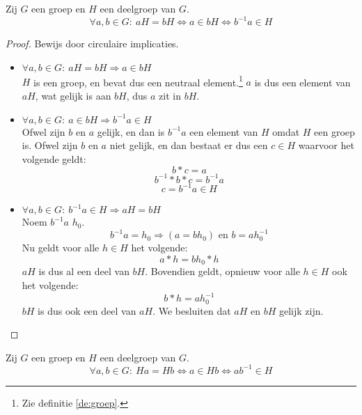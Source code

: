 \documentclass[main.tex]{subfiles}
\begin{document}
\begin{ei}
  \label{ei:linker-nevenklasse-eig}
  Zij $G$ een groep en $H$ een deelgroep van $G$.
  \[ \forall a,b \in G:\ aH = bH \Leftrightarrow a \in bH \Leftrightarrow b^{-1}a \in H \]

  \begin{proof}
    Bewijs door circulaire implicaties.
    \begin{itemize}
    \item $\forall a,b \in G:\ aH = bH \Rightarrow a \in bH$\\
      $H$ is een groep, en bevat dus een neutraal element.\footnote{Zie definitie \ref{de:groep}.}
      $a$ is dus een element van $aH$, wat gelijk is aan $bH$, dus $a$ zit in $bH$.
    \item $\forall a,b \in G:\ a \in bH \Rightarrow b^{-1}a \in H$\\
      Ofwel zijn $b$ en $a$ gelijk, en dan is $b^{-1}a$ een element van $H$ omdat $H$ een groep is.
      Ofwel zijn $b$ en $a$ niet gelijk, en dan bestaat er dus een $c \in H$ waarvoor het volgende geldt:
      \[ b*c = a\]
      \[ b^{-1}*b*c = b^{-1}a\]
      \[ c = b^{-1}a \in H \]
    \item $\forall a,b \in G:\ b^{-1}a \in H\Rightarrow aH = bH$\\
      Noem $b^{-1}a$ $h_{0}$.
      \[ b^{-1}a = h_{0} \Rightarrow (a = bh_{0}) \text { en } b = a h_{0}^{-1} \]
      Nu geldt voor alle $h \in H$ het volgende:
      \[ a * h = bh_{0}*h \]
      $aH$ is dus al een deel van $bH$.
      Bovendien geldt, opnieuw voor alle $h \in H$ ook het volgende:
      \[ b * h = ah_{0}^{-1} \]
      $bH$ is dus ook een deel van $aH$.
      We besluiten dat $aH$ en $bH$ gelijk zijn.
   \end{itemize}
  \end{proof}
\end{ei}

\begin{ei}
  \label{ei:rechter-nevenklasse-eig}
  Zij $G$ een groep en $H$ een deelgroep van $G$.
  \[ \forall a,b \in G:\ Ha = Hb \Leftrightarrow a \in Hb \Leftrightarrow ab^{-1} \in H \]

\end{ei}
\end{document}
